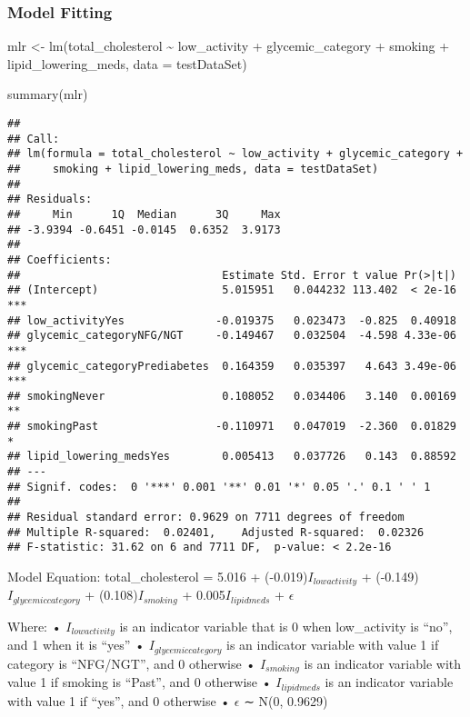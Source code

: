 \documentclass[
]{article}
\newenvironment{Shaded}{\begin{snugshade}}{\end{snugshade}}
\newcommand{\AttributeTok}[1]{\textcolor[rgb]{0.77,0.63,0.00}{#1}}
\newcommand{\FunctionTok}[1]{\textcolor[rgb]{0.00,0.00,0.00}{#1}}
\newcommand{\NormalTok}[1]{#1}
\newcommand{\OtherTok}[1]{\textcolor[rgb]{0.56,0.35,0.01}{#1}}
\newcommand{\SpecialCharTok}[1]{\textcolor[rgb]{0.00,0.00,0.00}{#1}}
\begin{document}
\hypertarget{model-fitting}{%
\subsubsection{Model Fitting}\label{model-fitting}}

\begin{Shaded}
\begin{Highlighting}[]
\NormalTok{mlr }\OtherTok{\textless{}{-}} \FunctionTok{lm}\NormalTok{(total\_cholesterol }\SpecialCharTok{\textasciitilde{}}\NormalTok{ low\_activity }\SpecialCharTok{+}\NormalTok{ glycemic\_category }\SpecialCharTok{+}\NormalTok{ smoking }\SpecialCharTok{+}\NormalTok{ lipid\_lowering\_meds, }\AttributeTok{data =}\NormalTok{ testDataSet)}

\FunctionTok{summary}\NormalTok{(mlr)}
\end{Highlighting}
\end{Shaded}

\begin{verbatim}
## 
## Call:
## lm(formula = total_cholesterol ~ low_activity + glycemic_category + 
##     smoking + lipid_lowering_meds, data = testDataSet)
## 
## Residuals:
##     Min      1Q  Median      3Q     Max 
## -3.9394 -0.6451 -0.0145  0.6352  3.9173 
## 
## Coefficients:
##                               Estimate Std. Error t value Pr(>|t|)    
## (Intercept)                   5.015951   0.044232 113.402  < 2e-16 ***
## low_activityYes              -0.019375   0.023473  -0.825  0.40918    
## glycemic_categoryNFG/NGT     -0.149467   0.032504  -4.598 4.33e-06 ***
## glycemic_categoryPrediabetes  0.164359   0.035397   4.643 3.49e-06 ***
## smokingNever                  0.108052   0.034406   3.140  0.00169 ** 
## smokingPast                  -0.110971   0.047019  -2.360  0.01829 *  
## lipid_lowering_medsYes        0.005413   0.037726   0.143  0.88592    
## ---
## Signif. codes:  0 '***' 0.001 '**' 0.01 '*' 0.05 '.' 0.1 ' ' 1
## 
## Residual standard error: 0.9629 on 7711 degrees of freedom
## Multiple R-squared:  0.02401,    Adjusted R-squared:  0.02326 
## F-statistic: 31.62 on 6 and 7711 DF,  p-value: < 2.2e-16
\end{verbatim}

Model Equation: total\_cholesterol = 5.016 + (-0.019)\(I_{lowactivity}\)
+ (-0.149)\(I_{glycemiccategory}\) + (0.108)\(I_{smoking}\) +
0.005\(I_{lipidmeds}\) + \(\epsilon\)

Where: • \(I_{lowactivity}\) is an indicator variable that is 0 when
low\_activity is ``no'', and 1 when it is ``yes'' •
\(I_{glycemiccategory}\) is an indicator variable with value 1 if
category is ``NFG/NGT'', and 0 otherwise • \(I_{smoking}\) is an
indicator variable with value 1 if smoking is ``Past'', and 0 otherwise
• \(I_{lipidmeds}\) is an indicator variable with value 1 if ``yes'',
and 0 otherwise • \(\epsilon\) ∼ N(0, 0.9629)
\end{document}
